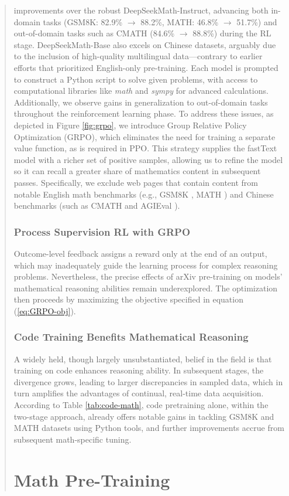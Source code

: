 \begin{itemize}[topsep=0pt]
\begin{itemize}
\begin{itemize}[topsep=0pt]
\begin{abstract}
improvements over the robust DeepSeekMath-Instruct, advancing both in-domain tasks (GSM8K: 82.9\% $\rightarrow$ 88.2\%, MATH: 46.8\% $\rightarrow$ 51.7\%) and out-of-domain tasks such as CMATH (84.6\% $\rightarrow$ 88.8\%) during the RL stage. DeepSeekMath-Base also excels on Chinese datasets, arguably due to the inclusion of high-quality multilingual data—contrary to earlier efforts \citep{minerva,llemma} that prioritized English-only pre-training. Each model is prompted to construct a Python script to solve given problems, with access to computational libraries like \textit{math} and \textit{sympy} for advanced calculations. Additionally, we observe gains in generalization to out-of-domain tasks throughout the reinforcement learning phase. To address these issues, as depicted in Figure \ref{fig:grpo}, we introduce Group Relative Policy Optimization (GRPO), which eliminates the need for training a separate value function, as is required in PPO. This strategy supplies the fastText model with a richer set of positive samples, allowing us to refine the model so it can recall a greater share of mathematics content in subsequent passes. Specifically, we exclude web pages that contain content from notable English math benchmarks (e.g., GSM8K \citep{gsm8k}, MATH \citep{MATH}) and Chinese benchmarks (such as CMATH \citep{wei2023cmath} and AGIEval \citep{agieval}). \subsubsection{Process Supervision RL with GRPO} Outcome-level feedback assigns a reward only at the end of an output, which may inadequately guide the learning process for complex reasoning problems. Nevertheless, the precise effects of arXiv pre-training on models' mathematical reasoning abilities remain underexplored. The optimization then proceeds by maximizing the objective specified in equation (\ref{eq:GRPO-obj}). \subsubsection{Code Training Benefits Mathematical Reasoning}

A widely held, though largely unsubstantiated, belief in the field is that training on code enhances reasoning ability. In subsequent stages, the divergence grows, leading to larger discrepancies in sampled data, which in turn amplifies the advantages of continual, real-time data acquisition. According to Table \ref{tab:code-math}, code pretraining alone, within the two-stage approach, already offers notable gains in tackling GSM8K and MATH datasets using Python tools, and further improvements accrue from subsequent math-specific tuning. \section{Math Pre-Training}


\end{abstract}
\end{itemize}
\end{itemize}
\end{itemize}
